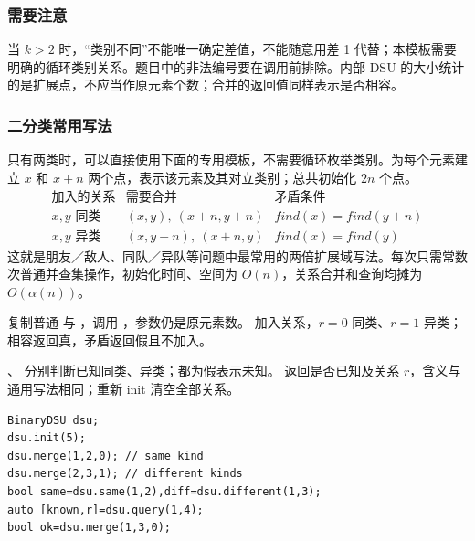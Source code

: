 \subsubsection*{需要注意}
当 $k>2$ 时，“类别不同”不能唯一确定差值，不能随意用差 1 代替；本模板需要明确的循环类别关系。题目中的非法编号要在调用前排除。内部 DSU 的大小统计的是扩展点，不应当作原元素个数；合并的返回值同样表示是否相容。

\subsubsection*{二分类常用写法}
只有两类时，可以直接使用下面的专用模板，不需要循环枚举类别。为每个元素建立 $x$ 和 $x+n$ 两个点，表示该元素及其对立类别；总共初始化 $2n$ 个点。
\[
\begin{array}{c|c|c}
\text{加入的关系}&\text{需要合并}&\text{矛盾条件}\\ \hline
x,y\text{ 同类}&(x,y),\ (x+n,y+n)&find(x)=find(y+n)\\
x,y\text{ 异类}&(x,y+n),\ (x+n,y)&find(x)=find(y)
\end{array}
\]
这就是朋友／敌人、同队／异队等问题中最常用的两倍扩展域写法。每次只需常数次普通并查集操作，初始化时间、空间为 $O(n)$，关系合并和查询均摊为 $O(\alpha(n))$。

复制普通  与 ，调用 ，参数仍是原元素数。 加入关系，$r=0$ 同类、$r=1$ 异类；相容返回真，矛盾返回假且不加入。

、 分别判断已知同类、异类；都为假表示未知。 返回是否已知及关系 $r$，含义与通用写法相同；重新 init 清空全部关系。
\begin{lstlisting}[style=mtycpp,numbers=none]
BinaryDSU dsu;
dsu.init(5);
dsu.merge(1,2,0); // same kind
dsu.merge(2,3,1); // different kinds
bool same=dsu.same(1,2),diff=dsu.different(1,3);
auto [known,r]=dsu.query(1,4);
bool ok=dsu.merge(1,3,0);
\end{lstlisting}

